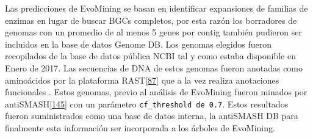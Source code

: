 \documentclass[12pt,twoside]{reedthesis}
\begin{document}
  Las predicciones de EvoMining se basan en identificar expansiones de
  familias de enzimas en lugar de buscar BGCs completos, por esta razón
  los borradores de genomas con un promedio de al menos 5 genes por contig
  también pudieron ser incluidos en la base de datos Genome DB. Los
  genomas elegidos fueron recopilados de la base de datos pública NCBI tal
  y como estaba disponible en Enero de 2017. Las secuencias de DNA de
  estos genomas fueron anotadas como aminoácidos por la plataforma
  RAST{[}\protect\hyperlink{ref-overbeek_seed_2014}{87}{]} que a la vez
  realiza anotaciones funcionales . Estos genomas, previo al análisis de
  EvoMining fueron minados por
  antiSMASH{[}\protect\hyperlink{ref-weber_antismash3_2015}{145}{]} con un
  parámetro \texttt{cf\_threshold\ de\ 0.7}. Estos resultados fueron
  suministrados como una base de datos interna, la antiSMASH DB para
  finalmente esta información ser incorporada a los árboles de EvoMining.
  
\end{document}
